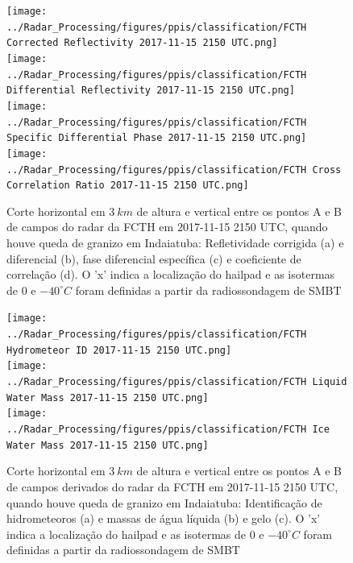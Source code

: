 \begin{figure}[hp]
	\centering
	\caption{Corte horizontal em $3\:km$ de altura e vertical entre os pontos A e B de campos do radar da FCTH em 2017-11-15 2150 UTC, quando houve queda de granizo em Indaiatuba: Refletividade corrigida (a) e diferencial (b), fase diferencial específica (c) e coeficiente de correlação (d). O 'x' indica a localização do hailpad e as isotermas de $0$ e $-40^{\circ}C$ foram definidas a partir da radiossondagem de SMBT}
	\label{radar_20171115}
	\vspace{-5pt}
	\texttt{[image: ../Radar\_Processing/figures/ppis/classification/FCTH Corrected Reflectivity 2017-11-15 2150 UTC.png]}
	\label{z_20171115} \\
	\vspace{-15pt}
	\texttt{[image: ../Radar\_Processing/figures/ppis/classification/FCTH Differential Reflectivity 2017-11-15 2150 UTC.png]}
	\label{zdr_20171115} \\
	\vspace{-15pt}
	\texttt{[image: ../Radar\_Processing/figures/ppis/classification/FCTH Specific Differential Phase 2017-11-15 2150 UTC.png]}
	\label{kdp_20171115} \\
	\vspace{-15pt}
	\texttt{[image: ../Radar\_Processing/figures/ppis/classification/FCTH Cross Correlation Ratio 2017-11-15 2150 UTC.png]}
	\label{rho_20171115} \\
	\vspace{-5pt}
\end{figure}

\begin{figure}[htb]
	\centering
	\caption{Corte horizontal em $3\:km$ de altura e vertical entre os pontos A e B de campos derivados do radar da FCTH em 2017-11-15 2150 UTC, quando houve queda de granizo em Indaiatuba: Identificação de hidrometeoros (a) e massas de água líquida (b) e gelo (c). O 'x' indica a localização do hailpad e as isotermas de $0$ e $-40^{\circ}C$ foram definidas a partir da radiossondagem de SMBT} 
	\label{radar_derived_20171115}
	\vspace{-5pt}
	\texttt{[image: ../Radar\_Processing/figures/ppis/classification/FCTH Hydrometeor ID 2017-11-15 2150 UTC.png]}
	\label{hid_20171115} \\
	\vspace{-15pt}
	\texttt{[image: ../Radar\_Processing/figures/ppis/classification/FCTH Liquid Water Mass 2017-11-15 2150 UTC.png]}
	\label{ml_20171115} \\
	\vspace{-15pt}
	\texttt{[image: ../Radar\_Processing/figures/ppis/classification/FCTH Ice Water Mass 2017-11-15 2150 UTC.png]}
	\label{mi_20171115} \\
	\vspace{-5pt}
\end{figure}

